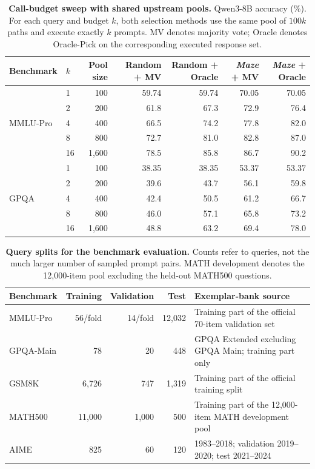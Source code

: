\begin{table}[ht]
\centering
\caption{\textbf{Call-budget sweep with shared upstream pools.}
Qwen3-8B accuracy (\%).
For each query and budget $k$, both selection methods use the same pool of $100k$ paths and execute exactly $k$ prompts.
MV denotes majority vote; Oracle denotes Oracle-Pick on the corresponding executed response set.}
\label{tab:controlled-sweep}
\small
\begin{tabular}{@{}llrrrrr@{}}
\toprule
Benchmark & $k$ & Pool size & Random + MV & Random + Oracle & \emph{Maze} + MV & \emph{Maze} + Oracle\\
\midrule
\multirow{5}{*}{MMLU-Pro}
& 1 & 100 & 59.74 & 59.74 & 70.05 & 70.05\\
& 2 & 200 & 61.8 & 67.3 & 72.9 & 76.4\\
& 4 & 400 & 66.5 & 74.2 & 77.8 & 82.0\\
& 8 & 800 & 72.7 & 81.0 & 82.8 & 87.0\\
& 16 & 1,600 & 78.5 & 85.8 & 86.7 & 90.2\\
\midrule
\multirow{5}{*}{GPQA}
& 1 & 100 & 38.35 & 38.35 & 53.37 & 53.37\\
& 2 & 200 & 39.6 & 43.7 & 56.1 & 59.8\\
& 4 & 400 & 42.4 & 50.5 & 61.2 & 66.7\\
& 8 & 800 & 46.0 & 57.1 & 65.8 & 73.2\\
& 16 & 1,600 & 48.8 & 63.2 & 69.4 & 78.0\\
\bottomrule
\end{tabular}
\end{table}

\begin{table}[ht]
\centering
\caption{\textbf{Query splits for the benchmark evaluation.}
Counts refer to queries, not the much larger number of sampled prompt pairs.
MATH development denotes the 12,000-item pool excluding the held-out MATH500 questions.}
\label{tab:data-splits}
\small
\begin{tabular}{@{}lrrrp{5.3cm}@{}}
\toprule
Benchmark & Training & Validation & Test & Exemplar-bank source\\
\midrule
MMLU-Pro & 56/fold & 14/fold & 12,032 & Training part of the official 70-item validation set\\
GPQA-Main & 78 & 20 & 448 & GPQA Extended excluding GPQA Main; training part only\\
GSM8K & 6,726 & 747 & 1,319 & Training part of the official training split\\
MATH500 & 11,000 & 1,000 & 500 & Training part of the 12,000-item MATH development pool\\
AIME & 825 & 60 & 120 & 1983--2018; validation 2019--2020; test 2021--2024\\
\bottomrule
\end{tabular}
\end{table}

